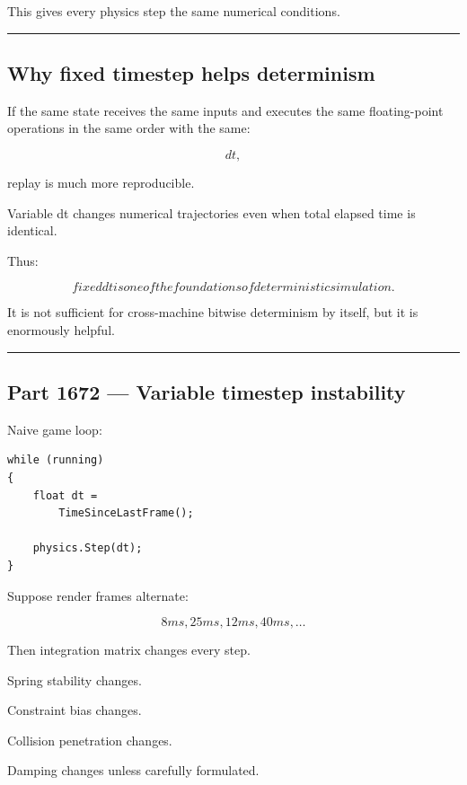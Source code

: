 This gives every physics step the same numerical conditions.

\begin{center}\rule{0.5\linewidth}{0.5pt}\end{center}

\subsection{Why fixed timestep helps determinism}\label{06-engine-ii-ch037-why-fixed-timestep-helps-determinism}

If the same state receives the same inputs and executes the same floating-point operations in the same order with the same:

\[
dt,
\]

replay is much more reproducible.

Variable dt changes numerical trajectories even when total elapsed time is identical.

Thus:

\[
\boxed{
fixed dt is one of the foundations of deterministic simulation.
}
\]

It is not sufficient for cross-machine bitwise determinism by itself, but it is enormously helpful.

\begin{center}\rule{0.5\linewidth}{0.5pt}\end{center}

\subsection{Part 1672 --- Variable timestep instability}\label{06-engine-ii-ch037-part-1672-variable-timestep-instability}

Naive game loop:

\begin{verbatim}
while (running)
{
    float dt =
        TimeSinceLastFrame();

    physics.Step(dt);
}
\end{verbatim}

Suppose render frames alternate:

\[
8ms,25ms,12ms,40ms,\dots
\]

Then integration matrix changes every step.

Spring stability changes.

Constraint bias changes.

Collision penetration changes.

Damping changes unless carefully formulated.

